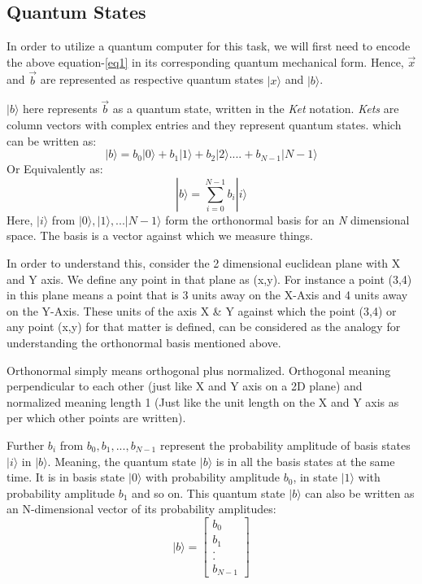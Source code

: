 \documentclass[12pt]{article}
\begin{document}
\subsection{Quantum States}
In order to utilize a quantum computer for this task, we will first need to encode the above equation-\ref{eq1} in its corresponding quantum mechanical form. Hence, $\vec{x}$ and $\vec{b}$ are represented as respective quantum states $|x\rangle$ and $|b\rangle$.\par
$|b\rangle$ here represents $\vec{b}$ as a quantum state, written in the \emph{Ket} notation. \emph{Kets} are column vectors with complex entries and they represent quantum states. which can be written as: 
\begin{displaymath}
    |b\rangle = b_0|0\rangle + b_1|1\rangle + b_2|2\rangle .... + b_{N-1}|N-1\rangle
\end{displaymath}
Or Equivalently as: 
\begin{displaymath}
    |b\rangle = \sum_{i=0}^{N-1} b_i |i\rangle
\end{displaymath}
Here, $|i\rangle$ from $|0\rangle, |1\rangle, ...|N-1\rangle$ form the orthonormal basis for an \emph{N} dimensional space. The basis is a vector against which we measure things.\par
In order to understand this, consider the 2 dimensional euclidean plane with X and Y axis. We define any point in that plane as (x,y). For instance a point (3,4) in this plane means a point that is 3 units away on the X-Axis and 4 units away on the Y-Axis. These units of the axis X \& Y against which the point (3,4) or any point (x,y) for that matter is defined, can be considered as the analogy for understanding the orthonormal basis mentioned above.\par
Orthonormal simply means orthogonal plus normalized. Orthogonal meaning perpendicular to each other (just like X and Y axis on a 2D plane) and normalized meaning length 1 (Just like the unit length on the X and Y axis as per which other points are written).\par
Further $b_i$ from $b_0, b_1,..., b_{N-1}$ represent the probability amplitude of basis states $|i\rangle$ in $|b\rangle$. Meaning, the quantum state $|b\rangle$ is in all the basis states at the same time. It is in basis state $|0\rangle$ with probability amplitude $b_0$, in state $|1\rangle$ with probability amplitude $b_1$ and so on.
This quantum state $|b\rangle$ can also be written as an N-dimensional vector of its probability amplitudes: 
\begin{displaymath}
    |b\rangle = \begin{bmatrix}
b_0\\
b_1\\
.\\
.\\
b_{N-1}
\end{bmatrix}
\end{displaymath}
\end{document}
